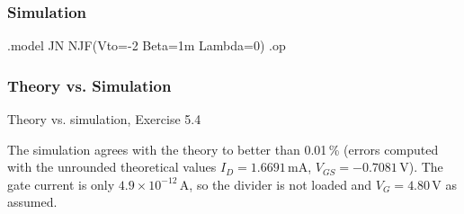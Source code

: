 \subsubsection*{Simulation}
\begin{spice}
.model JN NJF(Vto=-2 Beta=1m Lambda=0)
.op
\end{spice}

\subsubsection*{Theory vs. Simulation}
\begin{comparison}{Theory vs. simulation, Exercise 5.4}
\end{comparison}
\begin{solution}
The simulation agrees with the theory to better than 0.01\,\% (errors computed with the unrounded theoretical values
$I_D = 1.6691$\,mA, $V_{GS} = -0.7081$\,V). The gate current is only $4.9\times10^{-12}$\,A, so the divider is not loaded
and $V_G = 4.80$\,V as assumed.
\end{solution}
